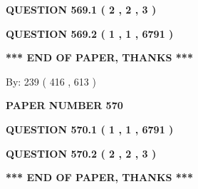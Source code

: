 \documentclass[12pt]{article}
\begin{document}
\vspace{0.2in}
  
{\textbf{\Large{QUESTION
569.1 
 ( 2 , 2 , 3 )
}}}
  
  
  
\vspace{0.2in}
  
{\textbf{\Large{QUESTION
569.2 
 ( 1 , 1 , 6791 )
}}}
  
  
   
   
 \vspace{0.2in}
 
   
   
   
   
\vspace{1.0in} 
{\textbf{\large{ *** END OF PAPER, THANKS *** }}} 
   
   
\hspace{1.0in} By: 
 239 ( 416 ,  613 )
   
   
   
   
\newpage 
\setcounter{page}{ 
   570001 } 
   
   
   
   
 {\textbf{ \Large{ PAPER NUMBER  570  }}}
   
   
\vspace{0.2in}
   
   
   
   
   
   
 \vspace{0.2in}
 
 
 
 
   
   
  
\vspace{0.2in}
  
{\textbf{\Large{QUESTION
570.1 
 ( 1 , 1 , 6791 )
}}}
  
  
  
\vspace{0.2in}
  
{\textbf{\Large{QUESTION
570.2 
 ( 2 , 2 , 3 )
}}}
  
  
   
   
 \vspace{0.2in}
 
   
   
   
   
\vspace{1.0in} 
{\textbf{\large{ *** END OF PAPER, THANKS *** }}} 
   
\end{document}
